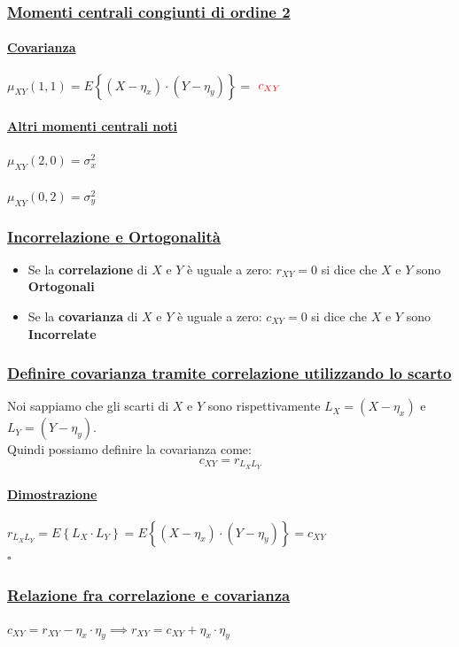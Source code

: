 \documentclass{article}
\begin{document}
\subsubsection{\underline{Momenti centrali congiunti di ordine 2}}
\paragraph{\underline{Covarianza}}
$\mu_{XY}(1,1) = E \left\{ (X-\eta_x) \cdot (Y-\eta_y) \right\} = $ $\color{red} c_{XY}$
\paragraph{\underline{Altri momenti centrali noti}}
$\mu_{XY}(2,0) = \sigma_x^2$ \\ \\
$\mu_{XY}(0,2) = \sigma_y^2$
\subsubsection{\underline{Incorrelazione e Ortogonalità}}
\begin{itemize}
    \item Se la \textbf{correlazione} di $X$ e $Y$ è uguale a zero: $r_{XY} = 0$ si dice che $X$ e $Y$ sono \textbf{Ortogonali}
    \item Se la \textbf{covarianza} di $X$ e $Y$ è uguale a zero: $c_{XY} = 0$ si dice che $X$ e $Y$ sono \textbf{Incorrelate}
\end{itemize}
\subsubsection{\underline{Definire covarianza tramite correlazione utilizzando lo scarto}}
Noi sappiamo che gli scarti di $X$ e $Y$ sono rispettivamente $L_X = \left( X - \eta_x \right)$ e $L_Y = \left( Y - \eta_y \right)$. \\
Quindi possiamo definire la covarianza come:
\[c_{XY} = r_{L_X L_Y}\]
\paragraph{\underline{Dimostrazione}}
$r_{L_X L_Y} = E \left\{ L_X \cdot L_Y \right\} = E \left\{ \left( X - \eta_x \right) \cdot \left( Y - \eta_y \right) \right\} = c_{XY}$ \\
\hspace*{0pt}\hfill $\square$
\subsubsection{\underline{Relazione fra correlazione e covarianza}}
$c_{XY} = r_{XY} - \eta_x \cdot \eta_y \implies r_{XY} = c_{XY} + \eta_x \cdot \eta_y$
\end{document}
